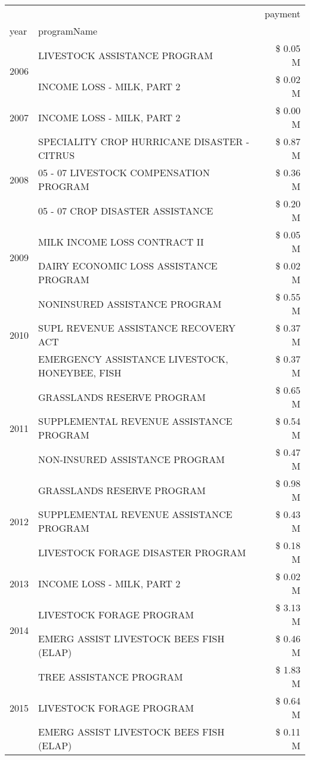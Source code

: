 \begin{tabular}{llr}
\toprule
 &  & payment \\
year & programName &  \\
\midrule
\multirow[t]{2}{*}{2006} & LIVESTOCK ASSISTANCE PROGRAM & \$ 0.05 M \\
 & INCOME LOSS - MILK, PART 2 & \$ 0.02 M \\
\cline{1-3}
2007 & INCOME LOSS - MILK, PART 2 & \$ 0.00 M \\
\cline{1-3}
\multirow[t]{3}{*}{2008} & SPECIALITY CROP HURRICANE DISASTER - CITRUS & \$ 0.87 M \\
 & 05 - 07 LIVESTOCK COMPENSATION PROGRAM & \$ 0.36 M \\
 & 05 - 07 CROP DISASTER ASSISTANCE & \$ 0.20 M \\
\cline{1-3}
\multirow[t]{2}{*}{2009} & MILK INCOME LOSS CONTRACT II & \$ 0.05 M \\
 & DAIRY ECONOMIC LOSS ASSISTANCE PROGRAM & \$ 0.02 M \\
\cline{1-3}
\multirow[t]{3}{*}{2010} & NONINSURED ASSISTANCE PROGRAM & \$ 0.55 M \\
 & SUPL REVENUE ASSISTANCE RECOVERY ACT & \$ 0.37 M \\
 & EMERGENCY ASSISTANCE LIVESTOCK, HONEYBEE, FISH & \$ 0.37 M \\
\cline{1-3}
\multirow[t]{3}{*}{2011} & GRASSLANDS RESERVE PROGRAM & \$ 0.65 M \\
 & SUPPLEMENTAL REVENUE ASSISTANCE PROGRAM & \$ 0.54 M \\
 & NON-INSURED ASSISTANCE PROGRAM & \$ 0.47 M \\
\cline{1-3}
\multirow[t]{3}{*}{2012} & GRASSLANDS RESERVE PROGRAM & \$ 0.98 M \\
 & SUPPLEMENTAL REVENUE ASSISTANCE PROGRAM & \$ 0.43 M \\
 & LIVESTOCK FORAGE DISASTER PROGRAM & \$ 0.18 M \\
\cline{1-3}
2013 & INCOME LOSS - MILK, PART 2 & \$ 0.02 M \\
\cline{1-3}
\multirow[t]{2}{*}{2014} & LIVESTOCK FORAGE PROGRAM & \$ 3.13 M \\
 & EMERG ASSIST LIVESTOCK BEES FISH (ELAP) & \$ 0.46 M \\
\cline{1-3}
\multirow[t]{3}{*}{2015} & TREE ASSISTANCE PROGRAM & \$ 1.83 M \\
 & LIVESTOCK FORAGE PROGRAM & \$ 0.64 M \\
 & EMERG ASSIST LIVESTOCK BEES FISH (ELAP) & \$ 0.11 M \\

\end{tabular}

